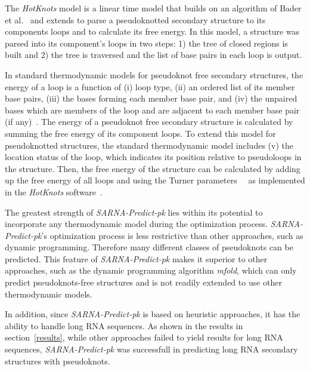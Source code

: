 \documentclass{doublecol-new}
\theoremstyle{TH}{
\newtheorem{lemma}{Lemma}
\newtheorem{theorem}[lemma]{Theorem}
\newtheorem{corrolary}[lemma]{Corrolary}
\newtheorem{conjecture}[lemma]{Conjecture}
\newtheorem{proposition}[lemma]{Proposition}
\newtheorem{claim}[lemma]{Claim}
\newtheorem{stheorem}[lemma]{Wrong Theorem}
\newtheorem{algorithm}{Algorithm}
}
\theoremstyle{THrm}{
\newtheorem{definition}{Definition}
\newtheorem{question}{Question}
\newtheorem{remark}{Remark}
\newtheorem{scheme}{Scheme}
}
\theoremstyle{THhit}{
\newtheorem{case}{Case}[section]
}
\begin{document}
The {\em HotKnots} model is a linear time model that builds on an
algorithm of Bader et al.~\cite{bader_2001} and extends to parse a
pseudoknotted secondary structure to its components loops and to
calculate its free energy. In this model, a structure was parsed
into its component's loops in two steps: 1) the tree of closed
regions is built and 2) the tree is traversed and the list of base
pairs in each loop is output.

In standard thermodynamic models for pseudoknot free secondary
structures, the energy of a loop is a function of (i) loop type,
(ii) an ordered list of its member base pairs, (iii) the bases
forming each member base pair, and (iv) the unpaired bases which are
members of the loop and are adjacent to each member base pair (if
any)~\cite{DBLP:conf/wabi/RastegariC05}. The energy of a
pseudoknot free secondary structure is calculated by summing the
free energy of its component loops. To extend this model for
pseudoknotted structures, the standard thermodynamic model includes
(v) the location status of the loop, which indicates its position
relative to pseudoloops in the structure. Then, the free energy of
the structure can be calculated by adding up the free energy of all
loops and using the Turner
parameters~\cite{serra_1995}~\cite{MathewsSZT99} as implemented in
the {\em HotKnots} software~\cite{ren_2005}.

The greatest strength of {\em SARNA-Predict-pk} lies within its potential 
to incorporate any thermodynamic model during the optimization process.
{\em SARNA-Predict-pk}'s optimization process is less restrictive than
other approaches, such as dynamic programming.  
Therefore many different classes of pseudoknots can be predicted.
This feature of {\em SARNA-Predict-pk} makes it
superior to other approaches, such as the dynamic programming algorithm {\em mfold}, which can only predict
pseudoknots-free structures and is not readily extended to use other thermodynamic models.

In addition, since {\em SARNA-Predict-pk} is based on heuristic approaches,
it has the ability to handle long RNA sequences.
As shown in the results in section~\ref{results}, while other approaches 
failed to yield results for long RNA sequences, {\em SARNA-Predict-pk} 
was successfull in predicting long RNA secondary structures with pseudoknots. 
\end{document}
